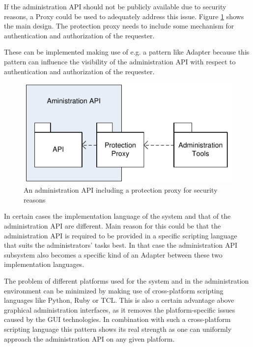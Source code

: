 If the administration API should not be publicly available due to security reasons, a {\sc Proxy} \cite{Buschmann1996} could be used to adequately address this issue. Figure \ref{fig:provideAPIDiagram-02} shows the main design. The protection proxy needs to include some mechanism for authentication and authorization of the requester.

These can be implemented making use of e.g. a pattern like {\sc Adapter} \cite{Gamma95} because this pattern can influence the visibility of the administration API with respect to authentication and authorization of the requester.

\begin{figure}[h]
\centering
\includegraphics{patterns/provideAPIDiagram-02.pdf}
\caption{An administration API including a protection proxy for security reasons}
\label{fig:provideAPIDiagram-02}
\end{figure}

In certain cases the implementation language of the system and that of the administration API are different. Main reason for this could be that the administration API is required to be provided in a specific scripting language that suits the administrators' tasks best. In that case the administration API subsystem also becomes a specific kind of an {\sc Adapter} \cite{Gamma95} between these two implementation languages.

The problem of different platforms used for the system and in the administration environment can be minimized by making use of cross-platform scripting languages like Python, Ruby or TCL. This is also a certain advantage above graphical administration interfaces, as it removes the platform-specific issues caused by the GUI technologies. In combination with such a cross-platform scripting language this pattern shows its real strength as one can uniformly approach the administration API on any given platform.

